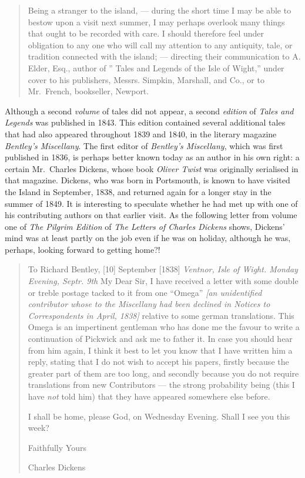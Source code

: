 \documentclass[
  12pt,
  a5paper,
  twoside]{book}
\begin{document}
\begin{quote}
Being a stranger to the island, --- during the short time I may be able
to bestow upon a visit next summer, I may perhaps overlook many things
that ought to be recorded with care. I should therefore feel under
obligation to any one who will call my attention to any antiquity, tale,
or tradition connected with the island; --- directing their
communication to A. Elder, Esq., author of '' Tales and Legends of the
Isle of Wight,'' under cover to his publishers, Messrs. Simpkin,
Marshall, and Co., or to Mr.~French, bookseller, Newport.
\end{quote}

Although a second \emph{volume} of tales did not appear, a second
\emph{edition} of \emph{Tales and Legends} was published in 1843. This
edition contained several additional tales that had also appeared
throughout 1839 and 1840, in the literary magazine \emph{Bentley's
Miscellany}. The first editor of \emph{Bentley's Miscellany}, which was
first published in 1836, is perhaps better known today as an author in
his own right: a certain Mr.~Charles Dickens, whose book \emph{Oliver
Twist} was originally serialised in that magazine. Dickens, who was born
in Portsmouth, is known to have visited the Island in September, 1838,
and returned again for a longer stay in the summer of 1849. It is
interesting to speculate whether he had met up with one of his
contributing authors on that earlier visit. As the following letter from
volume one of \emph{The Pilgrim Edition} of \emph{The Letters of Charles
Dickens} shows, Dickens' mind was at least partly on the job even if he
was on holiday, although he was, perhaps, looking forward to getting
home?!

\begin{quote}
To Richard Bentley, {[}10{]} September {[}1838{]} \emph{Ventnor, Isle of
Wight. \textbar{} Monday Evening, Septr. 9th} My Dear Sir, I have
received a letter with some double or treble postage tacked to it from
one ``Omega'' \emph{{[}an unidentified contributor whose to the
Miscellany had been declined in Notices to Correspondents in April,
1838{]}} relative to some german translations. This Omega is an
impertinent gentleman who has done me the favour to write a continuation
of Pickwick and ask me to father it. In case you should hear from him
again, I think it best to let you know that I have written him a reply,
stating that I do not wish to accept his papers, firstly because the
greater part of them are too long, and secondly because you do not
require translations from new Contributors --- the strong probability
being (this I have \emph{not} told him) that they have appeared
somewhere else before.

I shall be home, please God, on Wednesday Evening. Shall I see you this
week?

Faithfully Yours

Charles Dickens
\end{quote}
\end{document}
